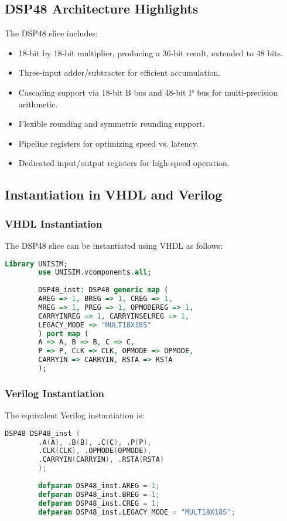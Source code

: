 \documentclass{article}
\begin{document}
	\subsection{DSP48 Architecture Highlights}
	The DSP48 slice includes:
	\begin{itemize}
		\item 18-bit by 18-bit multiplier, producing a 36-bit result, extended to 48 bits.
		\item Three-input adder/subtracter for efficient accumulation.
		\item Cascading support via 18-bit B bus and 48-bit P bus for multi-precision arithmetic.
		\item Flexible rounding and symmetric rounding support.
		\item Pipeline registers for optimizing speed vs. latency.
		\item Dedicated input/output registers for high-speed operation.
	\end{itemize}
	
	\subsection{Instantiation in VHDL and Verilog}
	\subsubsection{VHDL Instantiation}
	The DSP48 slice can be instantiated using VHDL as follows:
	\begin{lstlisting}[language=VHDL]
		Library UNISIM;
		use UNISIM.vcomponents.all;
		
		DSP48_inst: DSP48 generic map (
		AREG => 1, BREG => 1, CREG => 1,
		MREG => 1, PREG => 1, OPMODEREG => 1,
		CARRYINREG => 1, CARRYINSELREG => 1,
		LEGACY_MODE => "MULT18X18S"
		) port map (
		A => A, B => B, C => C,
		P => P, CLK => CLK, OPMODE => OPMODE,
		CARRYIN => CARRYIN, RSTA => RSTA
		);
	\end{lstlisting}
	
	\subsubsection{Verilog Instantiation}
	The equivalent Verilog instantiation is:
	\begin{lstlisting}[language=Verilog]
		DSP48 DSP48_inst (
		.A(A), .B(B), .C(C), .P(P),
		.CLK(CLK), .OPMODE(OPMODE),
		.CARRYIN(CARRYIN), .RSTA(RSTA)
		);
		
		defparam DSP48_inst.AREG = 1;
		defparam DSP48_inst.BREG = 1;
		defparam DSP48_inst.CREG = 1;
		defparam DSP48_inst.LEGACY_MODE = "MULT18X18S";
	\end{lstlisting}
	
\end{document}
